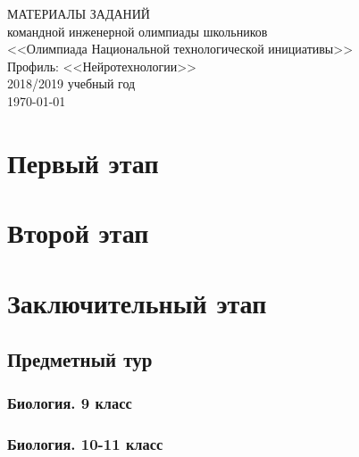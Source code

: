 \documentclass[a4paper,12pt,oneside]{book}
\begin{document}
\begin{titlepage}
    \begin{center}
        \huge{МАТЕРИАЛЫ ЗАДАНИЙ} \\
        \Large{командной инженерной олимпиады школьников} \\
        \Large{<<Олимпиада Национальной технологической инициативы>>} \\
        \Large{Профиль: <<Нейротехнологии>>} \\
        \large{2018/2019 учебный год} \\
        \vspace{2cm}
        \Large{\today}  
    \end{center}
\end{titlepage}

\setcounter{tocdepth}{1}

\tableofcontents

\part{Первый этап}




\part{Второй этап}




\part{Заключительный этап}

\clearpage
\chapter{Предметный тур}

\section{Биология. 9 класс}


\section{Биология. 10-11 класс}

\end{document}
